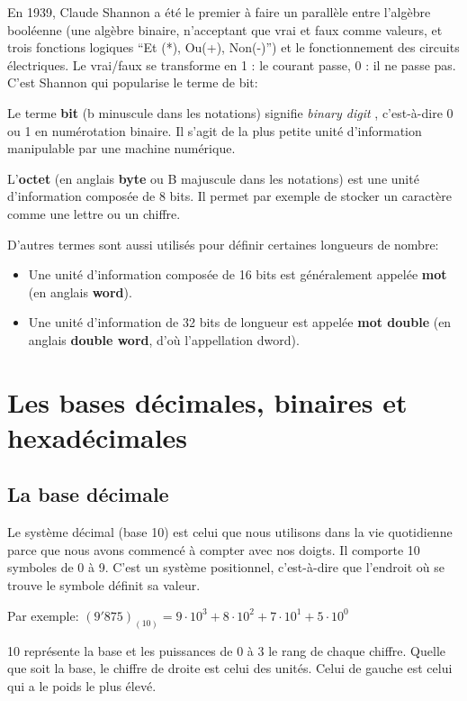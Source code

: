 \documentclass[11pt, a4paper]{book}
\begin{document}
En 1939, Claude Shannon a été le premier à faire un parallèle entre l'algèbre booléenne (une algèbre binaire, n'acceptant que vrai et faux comme valeurs, et trois fonctions logiques “Et (*), Ou(+), Non(-)”) et le fonctionnement des circuits électriques. Le vrai/faux se transforme en 1 : le courant passe, 0 : il ne passe pas. C'est Shannon qui popularise le terme de bit:

\begin{defi}
Le terme {\bf bit} (b minuscule dans les notations) signifie {\it binary digit }, c'est-à-dire 0 ou 1 en numérotation binaire. Il s'agit de la plus petite unité d'information manipulable par une machine numérique. 


L'{\bf octet} (en anglais {\bf byte} ou B majuscule dans les notations) est une unité d'information composée de 8 bits. Il permet par exemple de stocker un caractère comme une lettre ou un chiffre.
\end{defi}

D'autres termes sont aussi utilisés pour définir certaines longueurs de nombre:
\begin{itemize}
\item Une unité d'information composée de 16 bits est généralement appelée {\bf mot} (en anglais {\bf word}).

\item Une unité d'information de 32 bits de longueur est appelée {\bf mot double} (en anglais {\bf double word}, d'où l'appellation dword).
\end{itemize}


\section{Les bases décimales, binaires et hexadécimales}


\subsection{La base décimale}

Le système décimal (base 10) est celui que nous utilisons dans la vie quotidienne parce que nous avons commencé à compter avec nos doigts. Il comporte 10 symboles de 0 à 9. C'est un système positionnel, c'est-à-dire que l'endroit où se trouve le symbole définit sa valeur.

Par exemple: $(9'875)_{(10)}=9 \cdot 10^3 + 8 \cdot 10^2 + 7\cdot 10^1 + 5 \cdot 10^0$

10 représente la base et les puissances de 0 à 3 le rang de chaque chiffre. Quelle que soit la base, le chiffre de droite est celui des unités. Celui de gauche est celui qui a le poids le plus élevé.
\end{document}
